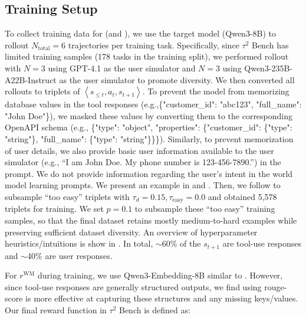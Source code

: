 \subsection{\wmrlshort{} Training Setup}
\label{subsec:tau2_wmrl_setup}
To collect training data for \wmrlshort{} (and \wmsftshort{}), we use the target model (Qwen3-8B) to rollout $N_{\mathrm{total}}=6$ trajectories per training task. Specifically, since $\tau^{2}$ Bench has limited training samples (178 tasks in the training split), we performed rollout with $N=3$ using GPT-4.1 as the user simulator and $N=3$ using Qwen3-235B-A22B-Instruct as the user simulator to promote diversity.
We then converted all rollouts to triplets of $\left\langle s_{\le t}, a_t, s_{t+1} \right\rangle$.
To prevent the model from memorizing database values in the tool responses (e.g.,\{"customer\_id": "abc123", "full\_name": "John Doe"\}), we masked these values by converting them to the corresponding OpenAPI schema (e.g., \{"type": "object", "properties": \{"customer\_id": \{"type": "string"\}, "full\_name": \{"type": "string"\}\}\}).
Similarly, to prevent memorization of user details, we also provide basic user information available to the user simulator (e.g., ``I am John Doe. My phone number is 123-456-7890.'') in the prompt.
We do not provide information regarding the user's intent in the world model learning prompts.
We present an example in  and .
Then, we follow  to subsample ``too easy'' triplets with $\tau_d=0.15,\tau_{\mathrm{easy}}=0.0$ and obtained 5,578 triplets for training.
We set $p = 0.1$ to subsample these ``too easy'' training samples, so that the final dataset retains mostly medium-to-hard examples while preserving sufficient dataset diversity.
An overview of hyperparameter heuristics/intuitions is show in .
In total, $\sim$60\% of the $s_{t+1}$ are tool-use responses and $\sim$40\% are user responses.

For $r^{\textrm{WM}}$ during training, we use Qwen3-Embedding-8B \citep{zhang2025qwen3embeddingadvancingtext} similar to .
However, since tool-use responses are generally structured outputs, we find using rouge-score \citep{lin-2004-rouge} is more effective at capturing these structures and any missing keys/values.
Our final reward function in $\tau^{2}$ Bench is defined as:


